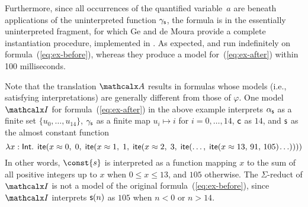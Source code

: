 \begin{example}
Furthermore, since all occurrences of the quantified variable~$a$ are 
beneath applications of the uninterpreted function $\gamma_{\mathsf{s}}$, 
the formula is in the essentially uninterpreted fragment,
for which Ge and de Moura \cite{GeDeM-CAV-09} provide 
a complete instantiation procedure, implemented in \ziii. 
As expected,
\cvc and \ziii run indefinitely on formula~(\ref{eq:ex-before}), 
whereas they produce a model for~(\ref{eq:ex-after}) 
within 100 milliseconds.\xend
\end{example}

\newcommand\badlambda{\lambda x : \typeint.\allowbreak\;\, \lite( x \teq 0,\allowbreak\; 0,\allowbreak\;
  \lite( x \teq 1,\allowbreak\; 1,\allowbreak\;
    \lite( x \teq 2,\allowbreak\; 3,\allowbreak\;
      \lite(\ldots,\allowbreak\; \lite( x \teq 13,\allowbreak\, 91,\allowbreak\, 105 )\negvthinspace \ldots ))))}

Note that the translation $\conv$ results in formulas whose models
(i.e., satisfying interpretations) are generally different from those of $\varphi$.
One model $\I$ for formula~(\ref{eq:ex-after}) in the above example interprets
$\alpha_{\mathsf{s}}$ as a finite set $\{ u_0, \ldots, u_{14} \}$,
$\gamma_{\mathsf{s}}$ as a finite map $u_i \mapsto i$ for $i = 0, \ldots, 14$,
$\mathsf{c}$ as $14$,
and $\mathsf{s}$ as the almost constant function
%
\[\badlambda\]
%
In other words, $\const{s}$ is interpreted as a function mapping $x$ to the sum
of all positive integers up to $x$ when $0 \leq x \leq 13$, and $105$
otherwise.
The $\Sigma$-reduct of $\I$ is not a model of the original formula~(\ref{eq:ex-before}),
since $\I$ 
interprets $\mathsf{s}( n )$ as $105$ when $n < 0$ or $n > 14$.

